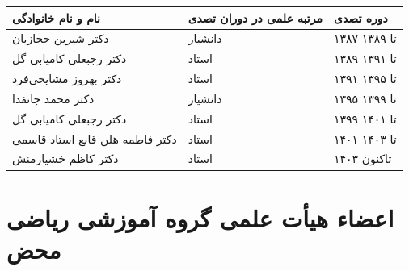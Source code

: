 \documentclass[
  letterpaper,
  DIV=11,
  numbers=noendperiod]{scrreprt}
\newcounter{none} %
\begin{document}
{\def\LTcaptype{none} %
\begin{longtable}[]{@{}lll@{}}
\toprule\noalign{}
نام و نام خانوادگی & مرتبه علمی در دوران تصدی & دوره تصدی \\
\midrule\noalign{}
\endhead
\bottomrule\noalign{}
\endlastfoot
دکتر شیرین حجازیان & دانشیار & ۱۳۸۷ تا ۱۳۸۹ \\
دکتر رجبعلی کامیابی گل & استاد & ۱۳۸۹ تا ۱۳۹۱ \\
دکتر بهروز مشایخی‌فرد & استاد & ۱۳۹۱ تا ۱۳۹۵ \\
دکتر محمد جانفدا & دانشیار & ۱۳۹۵ تا ۱۳۹۹ \\
دکتر رجبعلی کامیابی گل & استاد & ۱۳۹۹ تا ۱۴۰۱ \\
دکتر فاطمه هلن قانع استاد قاسمی & استاد & ۱۴۰۱ تا ۱۴۰۳ \\
دکتر کاظم خشیارمنش & استاد & ۱۴۰۳ تاکنون \\
\end{longtable}
}

\section{اعضاء هیأت علمی گروه آموزشی ریاضی
محض}\label{ux627ux639ux636ux627ux621-ux647ux6ccux623ux62a-ux639ux644ux645ux6cc-ux6afux631ux648ux647-ux622ux645ux648ux632ux634ux6cc-ux631ux6ccux627ux636ux6cc-ux645ux62dux636}
\end{document}
